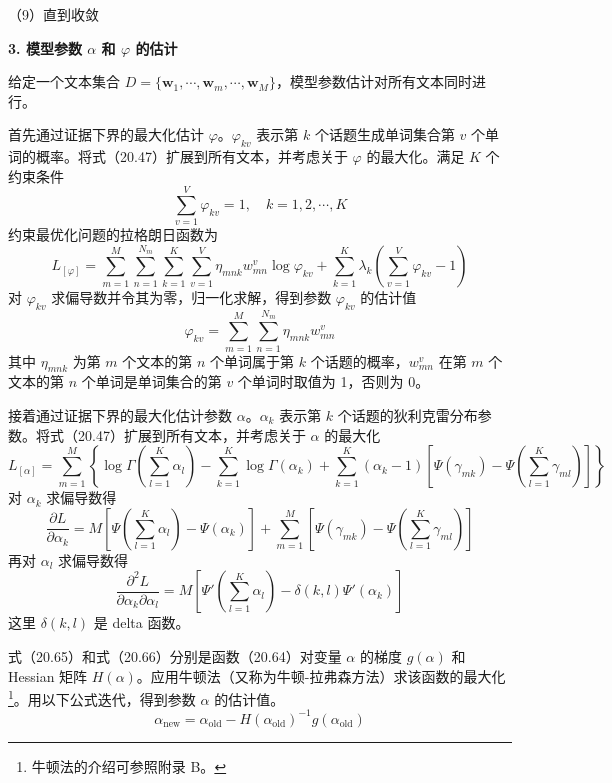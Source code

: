 \documentclass[UTF8,12pt,a4paper,fontset=fandol]{ctexart}
\begin{document}
（9）直到收敛

\noindent\textbf{3. 模型参数 $\alpha$ 和 $\varphi$ 的估计}

给定一个文本集合 $D=\{\mathbf{w}_1,\cdots,\mathbf{w}_m,\cdots,\mathbf{w}_M\}$，模型参数估计对所有文本同时进行。

首先通过证据下界的最大化估计 $\varphi$。$\varphi_{kv}$ 表示第 $k$ 个话题生成单词集合第 $v$ 个单词的概率。将式（20.47）扩展到所有文本，并考虑关于 $\varphi$ 的最大化。满足 $K$ 个约束条件
\[
\sum_{v=1}^V \varphi_{kv}=1,\quad k=1,2,\cdots,K
\]
约束最优化问题的拉格朗日函数为
\begin{equation}
L_{[\varphi]}=\sum_{m=1}^M\sum_{n=1}^{N_m}\sum_{k=1}^K\sum_{v=1}^V \eta_{mnk}w_{mn}^v\log\varphi_{kv}+\sum_{k=1}^K\lambda_k\left(\sum_{v=1}^V\varphi_{kv}-1\right)
\tag{20.63}
\end{equation}
对 $\varphi_{kv}$ 求偏导数并令其为零，归一化求解，得到参数 $\varphi_{kv}$ 的估计值
\begin{equation}
\varphi_{kv}=\sum_{m=1}^M\sum_{n=1}^{N_m}\eta_{mnk}w_{mn}^v
\tag{20.64}
\end{equation}
其中 $\eta_{mnk}$ 为第 $m$ 个文本的第 $n$ 个单词属于第 $k$ 个话题的概率，$w_{mn}^v$ 在第 $m$ 个文本的第 $n$ 个单词是单词集合的第 $v$ 个单词时取值为 1，否则为 0。

接着通过证据下界的最大化估计参数 $\alpha$。$\alpha_k$ 表示第 $k$ 个话题的狄利克雷分布参数。将式（20.47）扩展到所有文本，并考虑关于 $\alpha$ 的最大化
\begin{equation}
L_{[\alpha]}=\sum_{m=1}^M\left\{\log\Gamma\left(\sum_{l=1}^K\alpha_l\right)-\sum_{k=1}^K\log\Gamma(\alpha_k)+\sum_{k=1}^K(\alpha_k-1)\left[\Psi(\gamma_{mk})-\Psi\left(\sum_{l=1}^K\gamma_{ml}\right)\right]\right\}
\tag{20.65}
\end{equation}
对 $\alpha_k$ 求偏导数得
\begin{equation}
\frac{\partial L}{\partial\alpha_k}=M\left[\Psi\left(\sum_{l=1}^K\alpha_l\right)-\Psi(\alpha_k)\right]+\sum_{m=1}^M\left[\Psi(\gamma_{mk})-\Psi\left(\sum_{l=1}^K\gamma_{ml}\right)\right]
\tag{20.66}
\end{equation}
再对 $\alpha_l$ 求偏导数得
\begin{equation}
\frac{\partial^2 L}{\partial\alpha_k\partial\alpha_l}=M\left[\Psi'\left(\sum_{l=1}^K\alpha_l\right)-\delta(k,l)\Psi'(\alpha_k)\right]
\tag{20.67}
\end{equation}
这里 $\delta(k,l)$ 是 delta 函数。

式（20.65）和式（20.66）分别是函数（20.64）对变量 $\alpha$ 的梯度 $g(\alpha)$ 和 Hessian 矩阵 $H(\alpha)$。应用牛顿法（又称为牛顿-拉弗森方法）求该函数的最大化\footnote{牛顿法的介绍可参照附录 B。}。用以下公式迭代，得到参数 $\alpha$ 的估计值。
\begin{equation}
\alpha_{\mathrm{new}}=\alpha_{\mathrm{old}}-H(\alpha_{\mathrm{old}})^{-1}g(\alpha_{\mathrm{old}})
\tag{20.68}
\end{equation}
\end{document}
